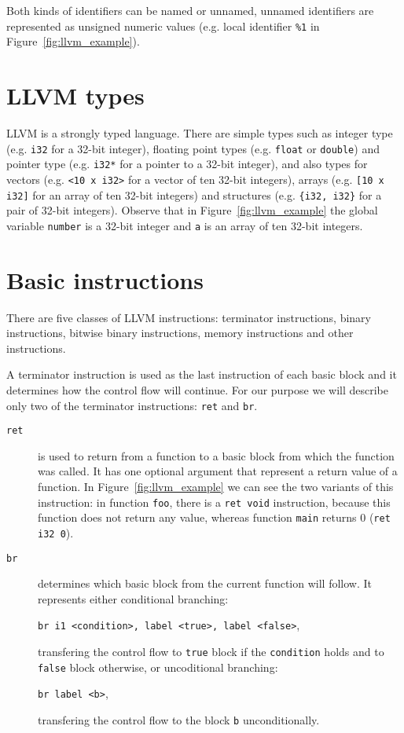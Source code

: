 Both kinds of identifiers can be named or unnamed, unnamed identifiers are
represented as unsigned numeric values (e.g. local identifier \texttt{\%1} in
Figure~\ref{fig:llvm_example}).

\section{LLVM types}

LLVM is a strongly typed language. There are simple types such as integer type
(e.g. \texttt{i32} for a 32-bit integer), floating point types (e.g.
\texttt{float} or \texttt{double}) and pointer type (e.g. \texttt{i32*} for a
pointer to a 32-bit integer), and also types for vectors (e.g. \texttt{<10 x
i32>} for a vector of ten 32-bit integers), arrays (e.g. \texttt{[10 x i32]}
for an array of ten 32-bit integers) and structures (e.g. \texttt{\{i32, i32\}}
for a pair of 32-bit integers). Observe that in Figure~\ref{fig:llvm_example}
the global variable \texttt{number} is a 32-bit integer and
\texttt{a} is an array of ten 32-bit integers.

\section{Basic instructions}

There are five classes of LLVM instructions: terminator instructions, binary
instructions, bitwise binary instructions, memory instructions and other
instructions. 

A terminator instruction is used as the last instruction of each basic block
and it determines how the control flow will continue. For our purpose we will
describe only two of the terminator instructions: \texttt{ret} and \texttt{br}.

\begin{description}
\item[\texttt{ret}] is used to return from a function to a basic block
from which the function was called. It has one optional argument that represent
a return value of a function. In Figure~\ref{fig:llvm_example} we can see the
two variants of this instruction: in function \texttt{foo}, there is a
\texttt{ret void} instruction, because this function does not return any value,
whereas function \texttt{main} returns 0 (\texttt{ret i32 0}).

\item[\texttt{br}] determines which basic block from the current function
will follow. It represents either conditional branching:

\texttt{br i1 <condition>, label <true>, label <false>},

transfering the control flow to \texttt{true} block if the \texttt{condition} holds and to
\texttt{false} block otherwise, or uncoditional branching:

\texttt{br label <b>},

transfering the control flow to the block \texttt{b} unconditionally.
\end{description}

